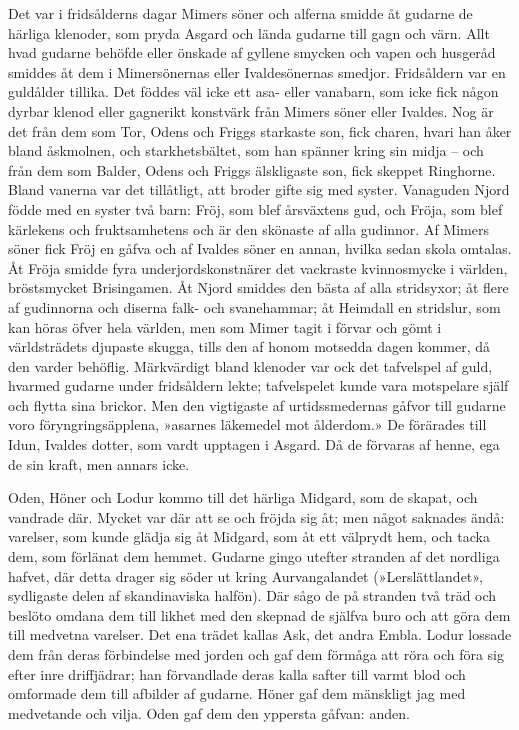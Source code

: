 Det var i fridsålderns dagar Mimers söner och alferna smidde åt gudarne
de härliga klenoder, som pryda Asgard och lända gudarne till gagn och
värn. Allt hvad gudarne behöfde eller önskade af gyllene smycken och
vapen och husgeråd smiddes åt dem i Mimersönernas eller Ivaldesönernas
smedjor. Fridsåldern var en guldålder tillika. Det föddes väl icke ett
asa- eller vanabarn, som icke fick någon dyrbar klenod eller gagnerikt
konstvärk från Mimers söner eller Ivaldes. Nog är det från dem som Tor,
Odens och Friggs starkaste son, fick charen, hvari han åker bland
åskmolnen, och starkhetsbältet, som han spänner kring sin midja -- och
från dem som Balder, Odens och Friggs älskligaste son, fick skeppet
Ringhorne. Bland vanerna var det tillåtligt, att broder gifte sig med
syster. Vanaguden Njord födde med en syster två barn: Fröj, som blef
årsväxtens gud, och Fröja, som blef kärlekens och fruktsamhetens och är
den skönaste af alla gudinnor. Af Mimers söner fick Fröj en
gåfva och af Ivaldes söner en annan, hvilka sedan skola omtalas. Åt
Fröja smidde fyra underjordskonstnärer det vackraste kvinnosmycke i
världen, bröstsmycket Brisingamen. Åt Njord smiddes den bästa af alla
stridsyxor; åt flere af gudinnorna och diserna falk- och svanehammar; åt
Heimdall en stridslur, som kan höras öfver hela världen, men som Mimer
tagit i förvar och gömt i världsträdets djupaste skugga, tills den af
honom motsedda dagen kommer, då den varder behöflig. Märkvärdigt bland
klenoder var ock det tafvelspel af guld, hvarmed gudarne under
fridsåldern lekte; tafvelspelet kunde vara motspelare själf och flytta
sina brickor. Men den vigtigaste af urtidssmedernas gåfvor till gudarne
voro föryngringsäpplena, »asarnes läkemedel mot ålderdom.» De förärades
till Idun, Ivaldes dotter, som vardt upptagen i Asgard. Då de förvaras
af henne, ega de sin kraft, men annars icke.



Oden, Höner och Lodur kommo till det härliga Midgard, som de skapat, och
vandrade där. Mycket var där att se och fröjda sig åt; men något
saknades ändå: varelser, som kunde glädja sig åt Midgard, som åt ett
välprydt hem, och tacka dem, som förlänat dem hemmet. Gudarne gingo
utefter stranden af det nordliga hafvet, där detta drager sig söder ut
kring Aurvangalandet (»Lerslättlandet», sydligaste delen af
skandinaviska halfön). Där sågo de på stranden två träd och beslöto
omdana dem till likhet med den skepnad de själfva buro och att göra dem
till medvetna varelser. Det ena trädet kallas Ask, det andra Embla.
Lodur lossade dem från deras förbindelse med jorden och gaf dem förmåga
att röra och föra sig efter inre driffjädrar; han förvandlade deras
kalla safter till varmt blod och omformade dem till afbilder af gudarne.
Höner gaf dem mänskligt jag med medvetande och vilja. Oden gaf dem den
yppersta gåfvan: anden.

